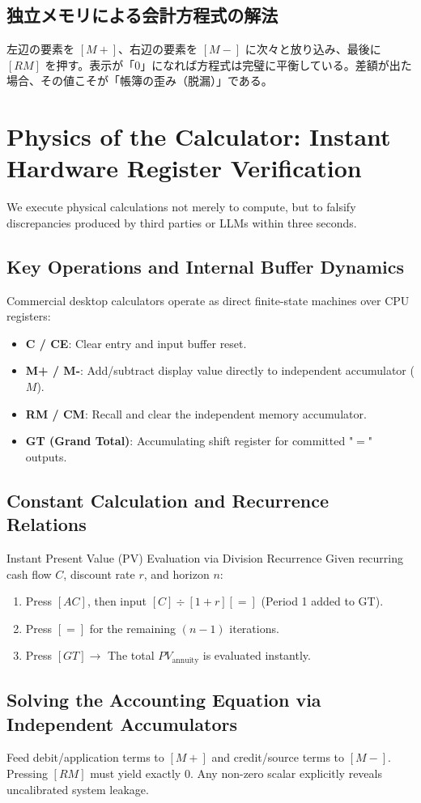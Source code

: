 \section{独立メモリによる会計方程式の解法}
左辺の要素を $[M+]$、右辺の要素を $[M-]$ に次々と放り込み、最後に $[RM]$ を押す。表示が「$0$」になれば方程式は完璧に平衡している。差額が出た場合、その値こそが「帳簿の歪み（脱漏）」である。

\else
\chapter{Physics of the Calculator: Instant Hardware Register Verification}
\label{chap:calculator_physics}

We execute physical calculations not merely to compute, but to falsify discrepancies produced by third parties or LLMs within three seconds.

\section{Key Operations and Internal Buffer Dynamics}
Commercial desktop calculators operate as direct finite-state machines over CPU registers:
\begin{itemize}
    \item \textbf{C / CE}: Clear entry and input buffer reset.
    \item \textbf{M+ / M-}: Add/subtract display value directly to independent accumulator ($M$).
    \item \textbf{RM / CM}: Recall and clear the independent memory accumulator.
    \item \textbf{GT (Grand Total)}: Accumulating shift register for committed "$=$" outputs.
\end{itemize}

\section{Constant Calculation and Recurrence Relations}


\begin{calcbox}{Instant Present Value (PV) Evaluation via Division Recurrence}
Given recurring cash flow $C$, discount rate $r$, and horizon $n$:
\begin{enumerate}
    \item Press $[AC]$, then input $[C] \div [1 + r] [=]$ (Period 1 added to GT).
    \item Press $[=]$ for the remaining $(n-1)$ iterations.
    \item Press $[GT] \to$ The total $PV_{\text{annuity}}$ is evaluated instantly.
\end{enumerate}
\end{calcbox}

\section{Solving the Accounting Equation via Independent Accumulators}
Feed debit/application terms to $[M+]$ and credit/source terms to $[M-]$. Pressing $[RM]$ must yield exactly $0$. Any non-zero scalar explicitly reveals uncalibrated system leakage.
\fi
